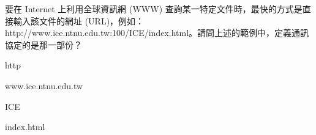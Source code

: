 \ifx\ntpcNinetyThree\undefined[93學年基北區] \fi
要在 Internet 上利用全球資訊網 (WWW) 查詢某一特定文件時，最快的方式是直接輸入該文件的網址 (URL)，例如：http://www.ice.ntnu.edu.tw:100/ICE/index.html。請問上述的範例中，定義通訊協定的是那一部份？
  \begin{optionlist}
  \item http\label{ntpc-93-a25}
  \item www.ice.ntnu.edu.tw
  \item ICE
  \item index.html
  \end{optionlist}